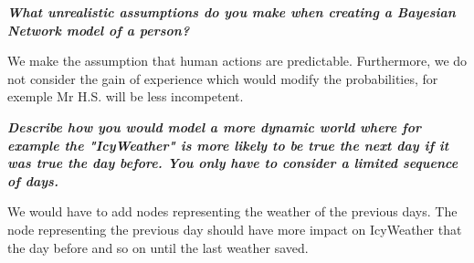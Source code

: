 \textit{\textbf{What unrealistic assumptions do you make when creating a
Bayesian Network model of a person?}}

\vspace{1em}
We make the assumption that human actions are predictable. Furthermore, we do not
consider the gain of experience which would modify the probabilities, for exemple
Mr H.S. will be less incompetent.

\textit{\textbf{Describe how you would model a more dynamic world where for
 example the "IcyWeather" is more likely to be true the next day if it was
 true the day before. You only have to consider a limited sequence of days.}}

 \vspace{1em}
We would have to add nodes representing the weather of the previous days.
The node representing the previous day should have more impact on IcyWeather that
the day before and so on until the last weather saved.

\newpage
\thispagestyle{empty}
